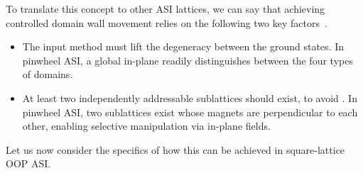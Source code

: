 To translate this concept to other ASI lattices, we can say that achieving controlled domain wall movement relies on the following two key factors~\cite{MAES-24}.
\begin{itemize}
	\item The input method must lift the degeneracy between the ground states. \newline
	In pinwheel ASI, a global in-plane  readily distinguishes between the four types of  domains.
	\item At least two independently addressable sublattices should exist, to avoid . \newline
	In pinwheel ASI, two sublattices exist whose magnets are perpendicular to each other, enabling selective manipulation via in-plane fields.
\end{itemize}
Let us now consider the specifics of how this can be achieved in square-lattice OOP ASI.

